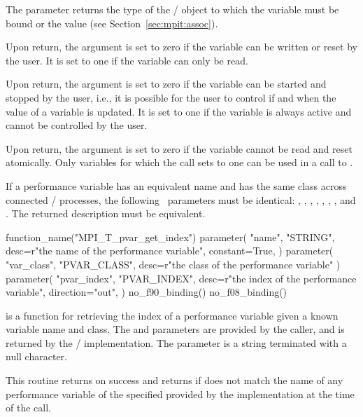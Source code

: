 The parameter  returns the type of the \MPI/ object to which
the variable must be bound or the value 
(see Section~\ref{sec:mpit:assoc}).

Upon return, the argument  is set to zero if the variable
can be written or reset by the user.  It is set to one if the variable can
only be read.

Upon return, the argument  is set to zero if the
variable can be started and stopped by the user, i.e., it is possible for
the user to control if and when the value of a variable is updated.  It is
set to one if the variable is always active and cannot be controlled by the
user.

Upon return, the argument  is set to zero if the variable
cannot be read and reset atomically.  Only variables for which the call
sets  to one can be used in a call to
.

If a performance variable has an equivalent name and has the same class
across connected \MPI/ processes, the following \OUT\  parameters must be
identical: , , ,
, , , ,
and .  The returned description must be equivalent.

\begin{mpi-binding}
    function_name("MPI_T_pvar_get_index")
    parameter(
        "name",
        "STRING",
        desc=r"the name of the performance variable",
        constant=True,
    )
    parameter(
        "var_class", "PVAR_CLASS", desc=r"the class of the performance variable"
    )
    parameter(
        "pvar_index",
        "PVAR_INDEX",
        desc=r"the index of the performance variable",
        direction="out",
    )
    no_f90_binding()
    no_f08_binding()
\end{mpi-binding}

 is a function for retrieving the index
of a performance variable given a known variable name and class.  The
 and  parameters are provided by the
caller, and  is returned by the \MPI/ implementation.
The  parameter is a string terminated with a null character.

This routine returns  on success and returns
 if  does not match the name
of any performance variable of the specified  provided
by the implementation at the time of the call.

